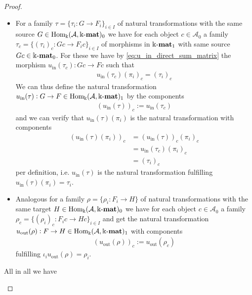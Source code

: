 \begin{proof}
\begin{enumerate}
\begin{subproof}[Proof of (ii)]
\begin{itemize}
\item For a family $\tau = \{ \tau_{i} : G \rightarrow F_{i} \}_{i \in I}$ of natural transformations with the same source
$G \in \mathrm{Hom_{\Bbbk}}(\mathcal{A},\Bbbk\textnormal{-}\mathbf{mat})_{0}$ we have for each object $c \in \mathcal{A}_{0}$ a family
$\tau_{c} = \{ (\tau_{i})_{c} : Gc \rightarrow F_{i}c \}_{i \in I}$ of morphisms in $\Bbbk\textnormal{-}\mathbf{mat}_{1}$ with same source $Gc \in \Bbbk\textnormal{-}\mathbf{mat}_{0}$.
For these we have by \eqref{eq:u_in_direct_sum_matrix} the morphism $u_{\text{in}}(\tau_{c}) : Gc \rightarrow Fc$ such that
\begin{align}
u_{\text{in}}(\tau_{c}) (\pi_{i})_{c} =
(\tau_{i})_{c}
\end{align}
We can thus define the natural transformation $u_{\text{in}}(\tau) : G \rightarrow F \in \mathrm{Hom_{\Bbbk}}(\mathcal{A},\Bbbk\textnormal{-}\mathbf{mat})_{1}$ by the components
\begin{align}
(u_{\text{in}}(\tau))_{c} := u_{\text{in}}(\tau_{c})
\end{align}
and we can verify that $u_{\text{in}}(\tau) (\pi_{i})$ is the natural transformation with components
\begin{align}
(u_{\text{in}}(\tau) (\pi_{i}))_{c} &= (u_{\text{in}}(\tau))_{c} (\pi_{i})_{c} \\
&= u_{\text{in}}(\tau_{c}) (\pi_{i})_{c} \\
&= (\tau_{i})_{c}
\end{align}
per definition, i.e. $u_{\text{in}}(\tau)$ is the natural transformation fulfilling $u_{\text{in}}(\tau) (\pi_{i}) = \tau_{i}$.
\item Analogous for a family $\rho = \{ \rho_{i} : F_{i} \rightarrow H \}$ of natural transformations with the same target
$H \in \mathrm{Hom_{\Bbbk}}(\mathcal{A},\Bbbk\textnormal{-}\mathbf{mat})_{0}$ we have for each object $c \in \mathcal{A}_{0}$ a family
$\rho_{c} = \{ (\rho_{i})_{c} : F_{i} c \rightarrow Hc \}_{i \in I}$ and get the
natural transformation $u_{\text{out}}(\rho) : F \rightarrow H \in \mathrm{Hom_{\Bbbk}}(\mathcal{A},\Bbbk\textnormal{-}\mathbf{mat})_{1}$ with components
\begin{align}
(u_{\text{out}}(\rho))_{c} := u_{\text{out}}(\rho_{c})
\end{align}
fulfilling $\iota_{i} u_{\text{out}}(\rho) = \rho_{i}$.
\end{itemize}

All in all we have 


\end{subproof}
\end{enumerate}
\end{proof}

